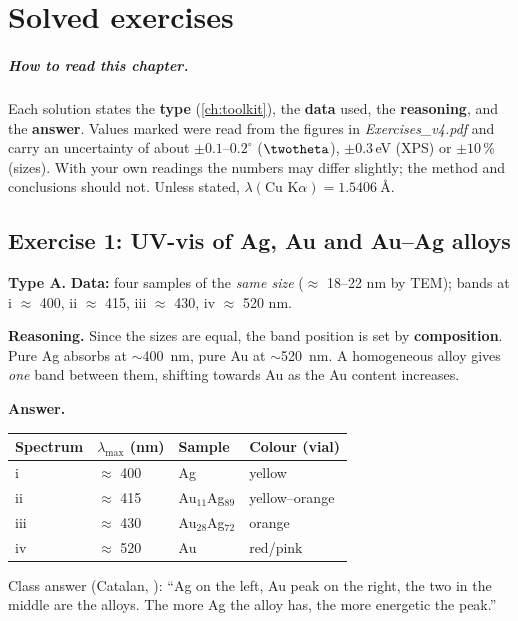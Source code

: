 \chapter{Solved exercises}
\label{ch:solutions}

\paragraph{How to read this chapter.} Each solution states the \textbf{type} (\cref{ch:toolkit}), the
\textbf{data} used, the \textbf{reasoning}, and the \textbf{answer}. Values marked \readoff{} were read from the figures in
\emph{Exercises\_v4.pdf} and carry an uncertainty of about $\pm0.1$--$0.2^\circ$ ($\twotheta$), $\pm0.3$\,eV (XPS) or
$\pm10$\,\% (sizes). With your own readings the numbers may differ slightly; the method and conclusions should not.
Unless stated, $\lambda(\text{Cu K}\alpha) = \SI{1.5406}{\angstrom}$.

\section{Exercise 1: UV-vis of Ag, Au and Au--Ag alloys}
\textbf{Type A.}
\textbf{Data:} four samples of the \emph{same size} ($\approx$ 18--22 nm by TEM); bands at
i $\approx$ 400, ii $\approx$ 415, iii $\approx$ 430, iv $\approx$ 520 nm\readoff.

\textbf{Reasoning.} Since the sizes are equal, the band position is set by \textbf{composition}. Pure Ag absorbs at
$\sim$\SI{400}{nm}, pure Au at $\sim$\SI{520}{nm}. A homogeneous alloy gives \emph{one} band between them, shifting
towards Au as the Au content increases.

\textbf{Answer.}
\begin{center}
\begin{tabular}{@{}llll@{}}
\toprule
Spectrum & $\lambda_\mathrm{max}$ (nm) & Sample & Colour (vial) \\ \midrule
i & $\approx$ 400 & Ag & yellow \\
ii & $\approx$ 415 & Au$_{11}$Ag$_{89}$ & yellow--orange \\
iii & $\approx$ 430 & Au$_{28}$Ag$_{72}$ & orange \\
iv & $\approx$ 520 & Au & red/pink \\
\bottomrule
\end{tabular}
\end{center}
\begin{classbox}
Class answer (Catalan, ): ``Ag on the left, Au peak on the right, the two in the middle are the alloys. The
more Ag the alloy has, the more energetic the peak.''
\end{classbox}

